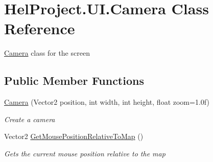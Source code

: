 \hypertarget{class_hel_project_1_1_u_i_1_1_camera}{}\section{Hel\+Project.\+U\+I.\+Camera Class Reference}
\label{class_hel_project_1_1_u_i_1_1_camera}


\hyperlink{class_hel_project_1_1_u_i_1_1_camera}{Camera} class for the screen  


\subsection*{Public Member Functions}
\begin{DoxyCompactItemize}
\item 
\hyperlink{class_hel_project_1_1_u_i_1_1_camera_a82aef3e39d157279ce806ab9e141e014}{Camera} (Vector2 position, int width, int height, float zoom=1.\+0f)
\begin{DoxyCompactList}\small\item\em Create a camera \end{DoxyCompactList}\item 
Vector2 \hyperlink{class_hel_project_1_1_u_i_1_1_camera_aa8d740d816da6a3d006a54c1d2234074}{Get\+Mouse\+Position\+Relative\+To\+Map} ()
\begin{DoxyCompactList}\small\item\em Gets the current mouse position relative to the map \end{DoxyCompactList}\end{DoxyCompactItemize}
